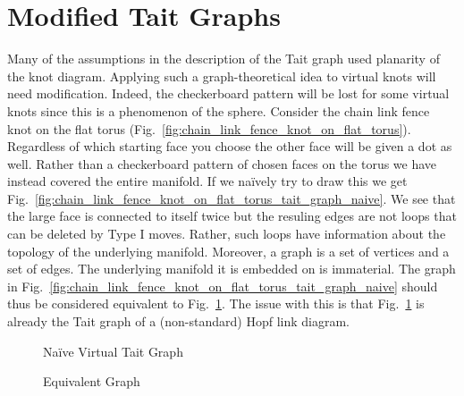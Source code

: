 \documentclass{article}
\theoremstyle{plain}
\begin{document}
    \section{Modified Tait Graphs}
        Many of the assumptions in the description of the Tait graph used
        planarity of the knot diagram. Applying such a graph-theoretical
        idea to virtual knots will need modification. Indeed, the checkerboard
        pattern will be lost for some virtual knots since this is a
        phenomenon of the sphere. Consider the chain link fence knot on the
        flat torus (Fig.~\ref{fig:chain_link_fence_knot_on_flat_torus}).
        Regardless of which starting face you choose the other face will be
        given a dot as well. Rather than a checkerboard pattern of chosen
        faces on the torus we have instead covered the entire manifold. If we
        na\"{i}vely try to draw this we get
        Fig.~\ref{fig:chain_link_fence_knot_on_flat_torus_tait_graph_naive}. We
        see that the large face is connected to itself twice but the
        resuling edges are not loops that can be deleted by Type I moves.
        Rather, such loops  have information about the topology of the
        underlying manifold. Moreover, a graph is a set of vertices and a set
        of edges. The underlying manifold it is embedded on is immaterial.
        The graph in
        Fig.~\ref{fig:chain_link_fence_knot_on_flat_torus_tait_graph_naive}
        should thus be considered equivalent to
        Fig.~\ref{fig:chain_link_fence_knot_naive_tait_graph}. The issue with
        this is that
        Fig.~\ref{fig:chain_link_fence_knot_naive_tait_graph} is already the
        Tait graph of a (non-standard) Hopf link diagram.
        \begin{figure}
            \centering
            \begin{minipage}[b]{0.49\textwidth}
                \centering
                \caption{Na\"{i}ve Virtual Tait Graph}
                \label{fig:chain_link_fence_knot_on_flat_torus_tait_graph_naive}
            \end{minipage}
            \hfill
            \begin{minipage}[b]{0.49\textwidth}
                \centering
                \vspace{3em}
                \caption{Equivalent Graph}
                \label{fig:chain_link_fence_knot_naive_tait_graph}
            \end{minipage}
        \end{figure}
\end{document}
